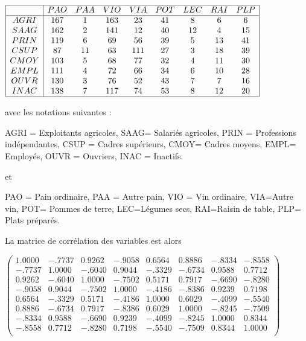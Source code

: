 \documentclass[letterpaper,10pt,english]{jupyterBook}
\begin{document}
\sphinxAtStartPar
\(
\begin{array}{|c|cccccccc|}
\hline
  &PAO  &PAA  &VIO& VIA&  POT&  LEC &RAI& PLP\\
\hline
AGRI  &167  &1  &163& 23& 41  &8& 6 &6\\
SAAG  &162& 2 &141& 12  &40 &12&  4&  15\\
PRIN  &119& 6 &69 &56 &39&  5 &13 &41\\
CSUP  &87 &11 &63 &111& 27& 3 &18 &39\\
CMOY  &103  &5  &68 &77 &32&  4 &11 &30\\
EMPL  &111  &4  &72 &66 &34&  6 &10 &28\\
OUVR  &130  &3  &76 &52 &43&  7 &7  &16\\
INAC  &138  &7  &117  &74&  53& 8 &12 &20\\
\hline
\end{array}
\)

\sphinxAtStartPar
avec les notations suivantes :

\sphinxAtStartPar
AGRI = Exploitants agricoles, SAAG= Salariés agricoles,   PRIN = Professions indépendantes, CSUP = Cadres supérieurs, CMOY= Cadres moyens, EMPL= Employés, OUVR = Ouvriers, INAC = Inactifs.

\sphinxAtStartPar
et

\sphinxAtStartPar
PAO = Pain ordinaire, PAA = Autre pain, VIO = Vin ordinaire, VIA=Autre vin, POT= Pommes de terre, LEC=Légumes secs, RAI=Raisin de table, PLP= Plats préparés.

\sphinxAtStartPar
La matrice de corrélation des variables est alors

\sphinxAtStartPar
\(\begin{pmatrix}
   1.0000   &  -.7737    & 0.9262    & -.9058    & 0.6564  &   0.8886   &  -.8334  &   -.8558\\
    -.7737    & 1.0000    & -.6040    & 0.9044    & -.3329    & -.6734    & 0.9588    & 0.7712\\
   0.9262    & -.6040    & 1.0000    & -.7502    & 0.5171    & 0.7917   &  -.6690     &-.8280\\
  -.9058    & 0.9044    & -.7502    & 1.0000    & -.4186    & -.8386    & 0.9239     &0.7198\\
    0.6564   &  -.3329    & 0.5171    & -.4186    & 1.0000   &  0.6029   &  -.4099    & -.5540\\
  0.8886   &  -.6734    & 0.7917   &  -.8386    & 0.6029   &  1.0000   &  -.8245    & -.7509\\
  -.8334    & 0.9588    & -.6690    & 0.9239    & -.4099    & -.8245    & 1.0000     &0.8344\\
   -.8558    & 0.7712   &  -.8280   &  0.7198   &  -.5540    & -.7509  &   0.8344    & 1.0000\\
\end{pmatrix}\)
\end{document}
